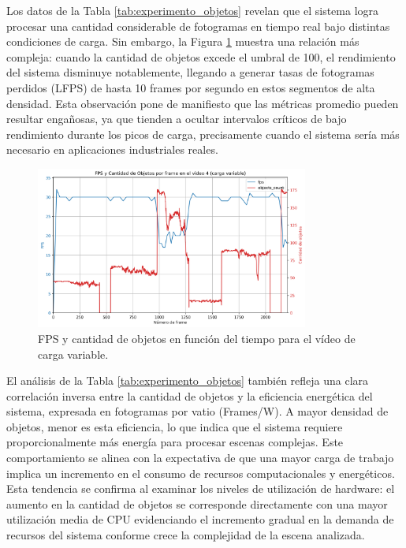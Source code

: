 \documentclass[11pt,spanish,listoffigures,listoftables]{tfgetsinf}
\begin{document}
Los datos de la Tabla \ref{tab:experimento_objetos} revelan que el sistema logra procesar una cantidad considerable de fotogramas en tiempo real bajo distintas condiciones de carga. Sin embargo, la Figura \ref{fig:fps_vs_object_count} muestra una relación más compleja: cuando la cantidad de objetos excede el umbral de 100, el rendimiento del sistema disminuye notablemente, llegando a generar tasas de fotogramas perdidos (LFPS) de hasta 10 frames por segundo en estos segmentos de alta densidad. Esta observación pone de manifiesto que las métricas promedio pueden resultar engañosas, ya que tienden a ocultar intervalos críticos de bajo rendimiento durante los picos de carga, precisamente cuando el sistema sería más necesario en aplicaciones industriales reales.

\begin{figure}
   \centering
   \includegraphics[width=0.8\textwidth]{excels/inferencia/cantidad_objetos/resultados/variable_fps_vs_object_count/fps_vs_object_count.png}
   \caption{FPS y cantidad de objetos en función del tiempo para el vídeo de carga variable.}
   \label{fig:fps_vs_object_count}
\end{figure}

El análisis de la Tabla \ref{tab:experimento_objetos} también refleja una clara correlación inversa entre la cantidad de objetos y la eficiencia energética del sistema, expresada en fotogramas por vatio (Frames/W). A mayor densidad de objetos, menor es esta eficiencia, lo que indica que el sistema requiere proporcionalmente más energía para procesar escenas complejas. Este comportamiento se alinea con la expectativa de que una mayor carga de trabajo implica un incremento en el consumo de recursos computacionales y energéticos. Esta tendencia se confirma al examinar los niveles de utilización de hardware: el aumento en la cantidad de objetos se corresponde directamente con una mayor utilización media de CPU evidenciando el incremento gradual en la demanda de recursos del sistema conforme crece la complejidad de la escena analizada.
\end{document}
